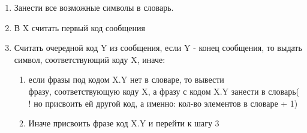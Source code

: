 \documentclass[discrete.tex]{subfiles}
\begin{document}
\begin{definition} [Декодирование]
    \begin{enumerate}
        \item Занести все возможные символы в словарь.
        \item В X считать первый код сообщения
        \item Считать очередной код Y из сообщения, если Y - конец сообщения, то выдать
            символ, соответствующий коду X, иначе:
            \begin{enumerate}
                \item если фразы под кодом X.Y нет в словаре, то вывести\\ фразу, 
                    соответствующую коду X, а фразу с кодом X.Y занести в словарь(
                    ! но присвоить ей другой код, а именно: кол-во элементов в словаре
                    + 1)
                \item Иначе присвоить фразе код X.Y и перейти к шагу 3 
            \end{enumerate}
    \end{enumerate}
\end{definition}
\end{document}
